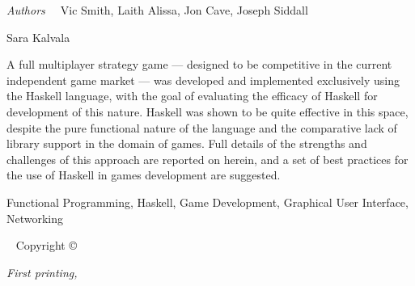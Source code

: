 \newpage
\begin{fullwidth}
	{\large {\it Authors\ \ } Vic Smith, Laith Alissa, Jon Cave, Joseph Siddall
	
	\vspace{1em} Sara Kalvala
	
	\vspace{1em} A full multiplayer strategy game --- designed to be competitive in the current independent game market --- was developed and implemented exclusively using the Haskell language, with the goal of evaluating the efficacy of Haskell for development of this nature. Haskell was shown to be quite effective in this space, despite the pure functional nature of the language and the comparative lack of library support in the domain of games. Full details of the strengths and challenges of this approach are reported on herein, and a set of best practices for the use of Haskell in games development are suggested.
	
	\vspace{1em} Functional Programming, Haskell, Game Development, Graphical User Interface, Networking
	
	}
	
	~\vfill
	\thispagestyle{empty}
	\setlength{\parindent}{0pt}
	\setlength{\parskip}{\baselineskip}
	Copyright \copyright\ \the\year\ \plainauthor
	
	\par{}
	
	
	\par\textit{First printing, \monthyear}

	\newpage

\end{fullwidth}



\begin{fullwidth}

\cleardoublepage

\tableofcontents

\cleardoublepage
{} \label{listoffig}
\listoffigures

\cleardoublepage
{} \label{listoflis}
\listoftables

\cleardoublepage
{} \label{listoflis}
\listofvlisting

\end{fullwidth}


